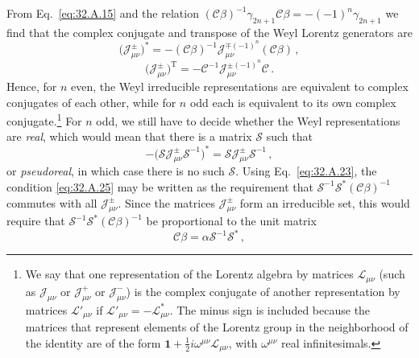 From Eq.~\eqref{eq:32.A.15} and the relation
\((\mathcal C\beta)^{-1}\gamma_{2n+1}\mathcal C\beta
=-(-1)^n\gamma_{2n+1}\) we find that the complex conjugate and transpose
of the Weyl Lorentz generators are
\begin{equation}
  \bigl(\mathcal J_{\mu\nu}^{\pm}\bigr)^*
  =-(\mathcal C\beta)^{-1}
    \mathcal J_{\mu\nu}^{\mp(-1)^n}
    (\mathcal C\beta)\,,
  \tag{32.A.23}\label{eq:32.A.23}
\end{equation}
\begin{equation}
  \bigl(\mathcal J_{\mu\nu}^{\pm}\bigr)^{\mathrm T}
  =-\mathcal C^{-1}\mathcal J_{\mu\nu}^{\pm(-1)^n}\mathcal C\,.
  \tag{32.A.24}\label{eq:32.A.24}
\end{equation}
Hence, for \(n\) even, the Weyl irreducible representations are equivalent
to complex conjugates of each other, while for \(n\) odd each is equivalent
to its own complex conjugate.\footnote{We say that one representation of
the Lorentz algebra by matrices \(\mathcal L_{\mu\nu}\) (such as
\(\mathcal J_{\mu\nu}\) or \(\mathcal J_{\mu\nu}^+\) or
\(\mathcal J_{\mu\nu}^-\)) is the complex conjugate of another
representation by matrices \(\mathcal L'_{\mu\nu}\) if
\(\mathcal L'_{\mu\nu}=-\mathcal L_{\mu\nu}^*\). The minus sign is included
because the matrices that represent elements of the Lorentz group in the
neighborhood of the identity are of the form
\(\mathbf{1}+\frac{1}{2}i\omega^{\mu\nu}\mathcal L_{\mu\nu}\), with
\(\omega^{\mu\nu}\) real infinitesimals.} For \(n\) odd, we still have to
decide whether the Weyl representations are \textit{real}, which would mean
that there is a matrix \(\mathcal S\) such that
\begin{equation}
  -\bigl(\mathcal S\mathcal J_{\mu\nu}^{\pm}\mathcal S^{-1}\bigr)^*
  =\mathcal S\mathcal J_{\mu\nu}^{\pm}\mathcal S^{-1}\,,
  \tag{32.A.25}\label{eq:32.A.25}
\end{equation}
or \textit{pseudoreal}, in which case there is no such \(\mathcal S\).
Using Eq.~\eqref{eq:32.A.23}, the condition \eqref{eq:32.A.25} may be
written as the requirement that
\(\mathcal S^{-1}\mathcal S^*(\mathcal C\beta)^{-1}\) commutes with all
\(\mathcal J_{\mu\nu}^{\pm}\). Since the matrices
\(\mathcal J_{\mu\nu}^{\pm}\) form an irreducible set, this would require
that \(\mathcal S^{-1}\mathcal S^*(\mathcal C\beta)^{-1}\) be proportional
to the unit matrix
\begin{equation}
  \mathcal C\beta=\alpha\mathcal S^{-1}\mathcal S^*\,,
  \tag{32.A.26}\label{eq:32.A.26}
\end{equation}
